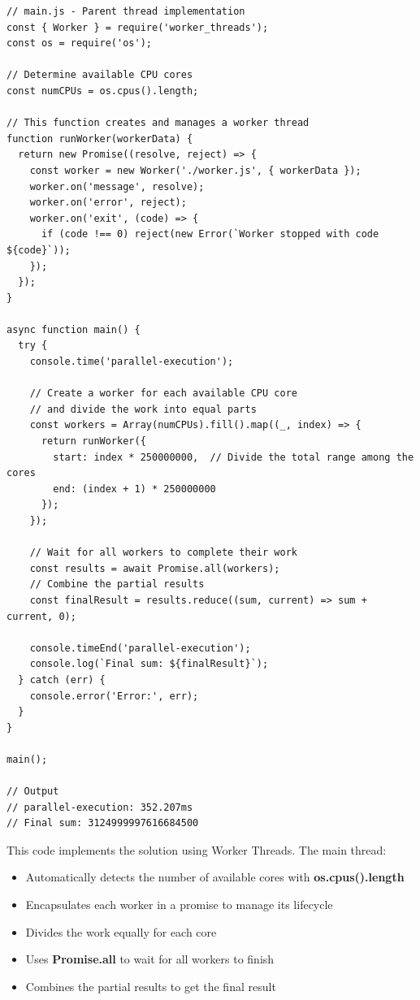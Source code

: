 \documentclass[12pt,letterpaper]{article}
\newenvironment{macterminal}{%
    \begin{mdframed}[
        linecolor=terminalFrame,
        backgroundcolor=terminalBg,
        roundcorner=5pt,
        skipabove=5pt,
        skipbelow=5pt,
        linewidth=1pt,
        innertopmargin=5pt,
        frametitle={%
            \tikz[baseline=(current bounding box.east), outer sep=0pt]{
                \fill[red!80!black] (0,0) circle (5pt);
                \fill[yellow!80!black] (0.7,0) circle (5pt);
                \fill[green!70!black] (1.4,0) circle (5pt);
            }
        },
        frametitlealignment=\raggedright,
        frametitleaboveskip=8pt,
        frametitlebelowskip=0pt,
    ]
}{%
    \end{mdframed}%
}
\begin{document}
\begin{macterminal}
\begin{lstlisting}
// main.js - Parent thread implementation
const { Worker } = require('worker_threads');
const os = require('os');

// Determine available CPU cores
const numCPUs = os.cpus().length;

// This function creates and manages a worker thread
function runWorker(workerData) {
  return new Promise((resolve, reject) => {
    const worker = new Worker('./worker.js', { workerData });
    worker.on('message', resolve);
    worker.on('error', reject);
    worker.on('exit', (code) => {
      if (code !== 0) reject(new Error(`Worker stopped with code ${code}`));
    });
  });
}

async function main() {
  try {
    console.time('parallel-execution');
    
    // Create a worker for each available CPU core
    // and divide the work into equal parts
    const workers = Array(numCPUs).fill().map((_, index) => {
      return runWorker({
        start: index * 250000000,  // Divide the total range among the cores
        end: (index + 1) * 250000000
      });
    });
    
    // Wait for all workers to complete their work
    const results = await Promise.all(workers);
    // Combine the partial results
    const finalResult = results.reduce((sum, current) => sum + current, 0);
    
    console.timeEnd('parallel-execution');
    console.log(`Final sum: ${finalResult}`);
  } catch (err) {
    console.error('Error:', err);
  }
}

main();

// Output
// parallel-execution: 352.207ms
// Final sum: 3124999997616684500
\end{lstlisting}
\end{macterminal}

This code implements the solution using Worker Threads. The main thread:
\begin{itemize}
    \item Automatically detects the number of available cores with \textbf{\textcolor{accentColor}{os.cpus().length}}
    \item Encapsulates each worker in a promise to manage its lifecycle
    \item Divides the work equally for each core
    \item Uses \textbf{\textcolor{accentColor}{Promise.all}} to wait for all workers to finish
    \item Combines the partial results to get the final result
\end{itemize}
\end{document}

